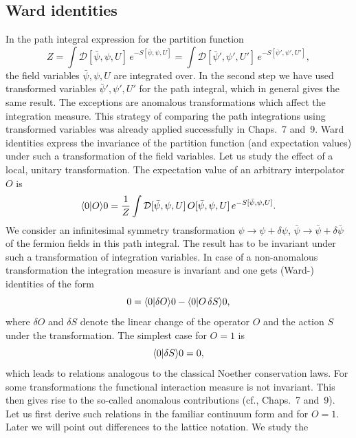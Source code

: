 \subsection{Ward identities}
In the path integral expression for the partition function
\begin{equation}
Z = \int \mathcal{D}[\bar{\psi},\psi,U]\, e^{-S[\bar{\psi},\psi,U]}
  = \int \mathcal{D}[\bar{\psi}',\psi',U']\, e^{-S[\bar{\psi}',\psi',U']} ,
\end{equation}
the field variables $\bar{\psi},\psi, U$ are integrated over. In the second step we have used
transformed variables $\bar{\psi}',\psi', U'$ for the path integral, which in general gives the
same result. The exceptions are anomalous transformations which affect the
integration measure. This strategy of comparing the path integrations using
transformed variables was already applied successfully in Chaps.~7 and~9. Ward
identities express the invariance of the partition function (and expectation
values) under such a transformation of the field variables.
Let us study the effect of a local, unitary transformation. The expectation
value of an arbitrary interpolator $O$ is
\begin{equation}
\langle0|O\rangle{0} =
\frac{1}{Z}\int \mathcal{D}[\bar{\psi},\psi,U]\, O[\bar{\psi},\psi,U]\, e^{-S[\bar{\psi},\psi,U]} .
\end{equation}
We consider an infinitesimal symmetry transformation $\psi \to \psi + \delta\psi$, $\bar{\psi} \to \bar{\psi} + \delta\bar{\psi}$ of the fermion fields in this path integral. The result has to be invariant under such a transformation of integration variables. In case of a
non-anomalous transformation the integration measure is invariant and one
gets (Ward-) identities of the form
\begin{equation}
0 = \langle0|\delta O\rangle{0} - \langle0|O\,\delta S\rangle{0} ,
\end{equation}
where $\delta O$ and $\delta S$ denote the linear change of the operator $O$ and the action
$S$ under the transformation. The simplest case for $O = 1$ is
\begin{equation}
\langle0|\delta S\rangle{0} = 0 ,
\end{equation}
which leads to relations analogous to the classical Noether conservation laws.
For some transformations the functional interaction measure is not invariant.
This then gives rise to the so-called anomalous contributions (cf., Chaps.~7
and~9).
Let us first derive such relations in the familiar continuum form and for
$O = 1$. Later we will point out differences to the lattice notation. We study the
